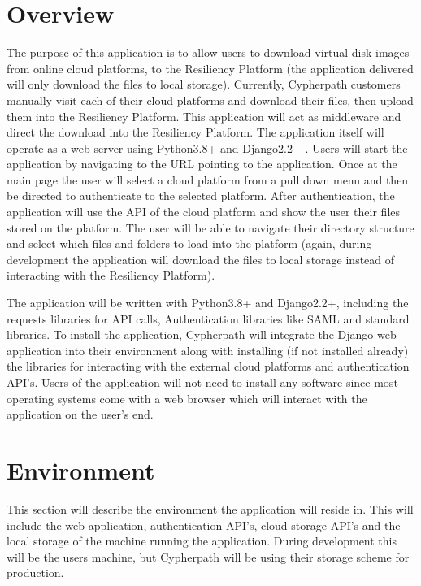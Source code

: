 \documentclass{article}
\begin{document}
	
    \section{Overview}
    The purpose of this application is to allow users to download virtual disk images from online cloud platforms, to the Resiliency Platform (the application delivered will only download the files to local storage).
    Currently, Cypherpath customers manually visit each of their cloud platforms and download their files, then upload them into the Resiliency Platform. This application will act as middleware and direct the download
    into the Resiliency Platform.
    The application itself will operate as a web server using Python3.8+ \cite{python} and Django2.2+ \cite{django}. Users will start the application by navigating to the URL pointing to the application.
    Once at the main page the user will select a cloud platform from a pull down menu and then be directed to authenticate to the selected platform. After authentication, the application will use the API of the cloud
    platform and show the user their files stored on the platform.
    The user will be able to navigate their directory structure and select which files and folders to load into the platform (again, during development the application will download the files to local storage instead
    of interacting with the Resiliency Platform).

    The application will be written with Python3.8+ and Django2.2+, including the requests libraries for API calls, Authentication libraries like SAML
    and standard libraries. To install the application, Cypherpath will integrate the Django web application into their environment along with installing (if not installed already)
    the libraries for interacting with the external cloud platforms and authentication API's. Users of the application will not need to install any software since most operating systems come
    with a web browser which will interact with the application on the user's end.


    \section{Environment}
    This section will describe the environment the application will reside in. This will include the web application, authentication API's, cloud storage API's and the local storage
    of the machine running the application. During development this will be the users machine, but Cypherpath will be using their storage scheme for production.
	
\end{document}
